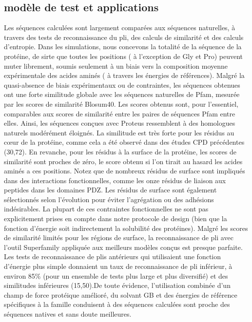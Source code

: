 \subsection{modèle de test et applications}

Les séquences calculées sont largement comparées aux séquences naturelles, à travers des tests de reconnaissance du pli, des calculs de similarité et des calculs d'entropie. Dans les simulations, nous concevons la totalité de la séquence de la protéine, de sirte que toutes les positions  ( à l'exception de Gly et Pro) peuvent muter librement, soumis seulement à un biais vers la composition moyenne expérimentale des acides aminés ( à travers les énergies de références). Malgré la quasi-absence de biais expérimentaux ou de contraintes, les séquences obtenues ont une forte similitude globale avec les séquences naturelles de Pfam, mesurée par les scores de similarité Blosum40. Les scores obtenus sont, pour l'essentiel, comparables aux scores de similarité entre les paires de séquences Pfam entre elles.  Ainsi, les séquences conçues avec Proteus ressemblent à des homologues naturels modérément éloignés. La similitude est très forte pour les résidus au cœur de la protéine, comme cela a été observé dans des études CPD précédentes (30,72). En revanche, pour les résidus à la surface de la protéine, les scores de similarité sont proches de zéro, le score obtenu si l'on tirait au hasard les acides aminés a ces positions. Notez que de nombreux résidus de surface sont impliqués dans des interactions fonctionnelles, comme les onze résidus de liaison aux peptides dans les domaines PDZ. Les résidus de surface sont également sélectionnés selon l'évolution pour éviter l'agrégation ou des adhésions indésirables. La plupart de ces contraintes fonctionnelles ne sont pas explicitement prises en compte dans  notre protocole de design (bien que la fonction d'énergie soit indirectement la solubilité des protéines). Malgré les scores de similarité limités pour les régions de surface, la reconnaissance de pli avec l'outil Superfamily  appliquée aux meilleurs modèles conçus est presque parfaite. Les tests de reconnaissance de plis antérieurs qui utilisaient une fonction d'énergie plus simple donnaient un taux de reconnaissance de pli inférieur, à environ 85\% (pour un ensemble de tests plus large et plus diversifié) et des similitudes inférieures (15,50).De toute évidence, l'utilisation combinée d'un champ de force protéique amélioré, du solvant GB et des énergies de référence spécifiques à la famille conduisent à des séquences calculées sont proche des séquences natives et sans doute meilleures.

